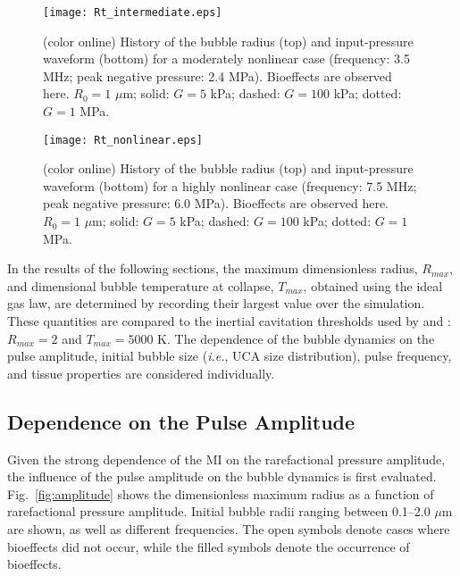 \documentclass[%
preprint,%
author-year,%
]{jasatex}
\begin{document}
\begin{figure*}[!t]
  \centering \texttt{[image: Rt\_intermediate.eps]}%
  \caption{(color online) History of the bubble radius (top) and input-pressure
    waveform (bottom) for a moderately nonlinear case (frequency: 3.5 MHz; peak 
    negative pressure: 2.4 MPa). Bioeffects are
    observed here. $R_0=1$ $\mu$m; solid: $G=5$ kPa; dashed: $G=100$ kPa;
    dotted: $G=1$ MPa.}
  \label{fig:sample_bubble_intermediate}
\end{figure*}

\begin{figure*}[!t]
  \centering \texttt{[image: Rt\_nonlinear.eps]}
  \caption{(color online) History of the bubble radius (top) and input-pressure
    waveform (bottom) for a highly nonlinear case (frequency: 
    7.5 MHz; peak negative pressure: 6.0 MPa). Bioeffects are observed
    here. $R_0=1$ $\mu$m; solid: $G=5$ kPa; dashed: $G=100$ kPa; dotted: $G=1$ MPa.}
  \label{fig:sample_bubble_nonlinear}
\end{figure*}

In the results of the following sections, the maximum dimensionless radius,
$R_{max}$, and dimensional bubble temperature at collapse, $T_{max}$, obtained
using the ideal gas law, are determined by recording their largest
value over the simulation. These quantities are compared to the
inertial cavitation thresholds used by \cite{apfel1991} and
\cite{yang2005}: $R_{max}=2$ and $T_{max}=5000$ K. The dependence
of the bubble dynamics on the pulse amplitude, initial
bubble size (\emph{i.e.}, UCA size distribution), 
pulse frequency, and tissue properties are considered
individually. 



\subsection{Dependence on the Pulse Amplitude}

Given the strong dependence of the MI on the rarefactional pressure
amplitude, the influence of the pulse amplitude on the bubble dynamics
is first evaluated. Fig.~\ref{fig:amplitude} shows the dimensionless
maximum radius as a function of rarefactional pressure
amplitude. Initial bubble radii ranging between 0.1--2.0 $\mu$m are
shown, as well as different frequencies. The open symbols denote
cases where bioeffects did not occur, while the filled symbols denote
the occurrence of bioeffects.
\end{document}
